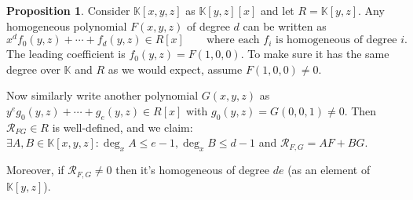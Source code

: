 \documentclass{article}
\newcommand{\K}{\mathbb{K}}
\newcommand{\re}{\mathcal{R}}
\theoremstyle{definition}
\newtheorem{prop}[defn]{Proposition}
\begin{document}
\begin{prop}
Consider $\K[x,y,z]$ as $\K[y,z][x]$ and let $R=\K[y,z]$. Any homogeneous polynomial $F(x,y,z)$ of degree $d$ can be written as
\[
x^df_0(y,z)+\cdots+f_d(y,z)\in R[x]\qquad\text{where each }f_i\text{ is homogeneous of degree }i.
\]
The leading coefficient is $f_0(y,z)=F(1,0,0)$. To make sure it has the same degree over $\K$ and $R$ as we would expect, assume $F(1,0,0)\neq 0$.

Now similarly write another polynomial $G(x,y,z)$ as $y^eg_0(y,z)+\cdots+g_e(y,z)\in R[x]$ with $g_0(y,z)=G(0,0,1)\neq 0$. Then $\re_{FG}\in R$ is well-defined, and we claim: $\exists A,B\in\K[x,y,z]:\deg_xA\leq e-1,\deg_xB\leq d-1$ and $\re_{F,G}=AF+BG$.

Moreover, if $\re_{F,G}\neq 0$ then it's homogeneous of degree $de$ (as an element of $\K[y,z]$).
\end{prop}
\end{document}

